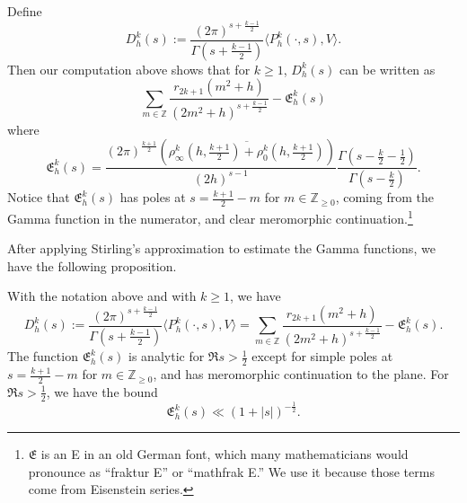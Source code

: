Define
\begin{equation}\label{eq:hyp:Dh_def}
  D^k_h(s) := \frac{(2\pi)^{s + \frac{k-1}{2}}}{\Gamma(s + \frac{k-1}{2})} \langle
  P_h^k(\cdot, s), V\rangle.
\end{equation}
Then our computation above shows that for $k \geq 1$, $D^k_h(s)$ can be written as
\begin{equation}\label{eq:basic_expansion_final}
  \sum_{m \in \mathbb{Z}}\frac{r_{2k+1}(m^2 + h)}{(2m^2 + h)^{s + \frac{k-1}{2}}} -
  \mathfrak{E}_h^k(s)
\end{equation}
where
\begin{equation}
  \mathfrak{E}_h^k(s) =  \frac{(2\pi)^{\frac{k+1}{2}} (\overline{\rho_\infty^k(h,
  \frac{k+1}{2}) + \rho_0^k(h, \frac{k+1}{2})})}{(2 h)^{s-1}} \frac{\Gamma(s - \frac{k}{2}
- \frac{1}{2})}{\Gamma(s - \frac{k}{2})}.
\end{equation}
Notice that $\mathfrak{E}_h^k(s)$ has poles at $s = \frac{k+1}{2} - m$ for $m \in
\mathbb{Z}_{\geq 0}$, coming from the Gamma function in the
numerator, and clear meromorphic continuation.\footnote{$\mathfrak{E}$ is an E in an old
  German font, which many mathematicians would pronounce as ``fraktur E'' or ``mathfrak
E.'' We use it because those terms come from Eisenstein series.}



After applying Stirling's approximation to estimate the Gamma functions, we have the
following proposition.


\begin{proposition}\label{prop:nonspectral_analytic_props_large_dim}
  With the notation above and with $k \geq 1$, we have
  \begin{equation}
    D^k_h(s) := \frac{(2\pi)^{s + \frac{k-1}{2}}}{\Gamma(s + \frac{k-1}{2})} \langle
    P_h^k(\cdot, s), V\rangle = \sum_{m \in \mathbb{Z}}\frac{r_{2k+1}(m^2 + h)}{(2m^2 +
  h)^{s + \frac{k-1}{2}}} - \mathfrak{E}_h^k(s).
  \end{equation}
  The function $\mathfrak{E}_h^k(s)$ is analytic for $\Re s > \frac{1}{2}$ except for
  simple poles at $s = \frac{k+1}{2} - m$ for $m \in \mathbb{Z}_{\geq 0}$, and has
  meromorphic continuation to the plane.
  For $\Re s > \frac{1}{2}$, we have the bound
  \begin{equation}
    \mathfrak{E}_h^k(s) \ll (1 + \lvert s \rvert)^{-\frac{1}{2}}.
  \end{equation}
\end{proposition}





